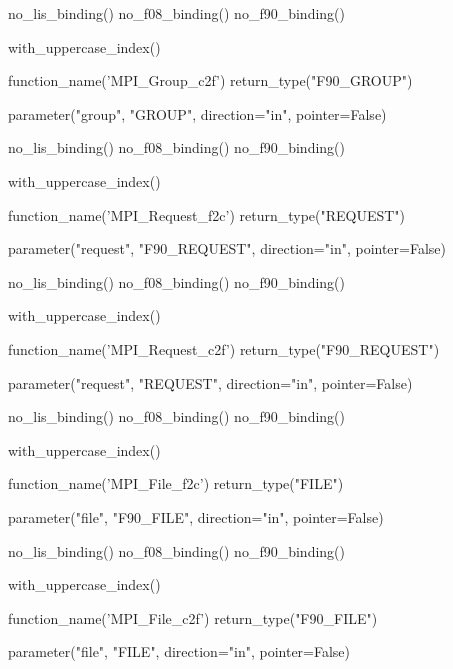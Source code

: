 %
\begin{mpi-binding}
    no_lis_binding()
    no_f08_binding()
    no_f90_binding()

    with_uppercase_index()

    function_name('MPI_Group_c2f')
    return_type("F90_GROUP")

    parameter("group", "GROUP", direction="in", pointer=False)
\end{mpi-binding}

%
\begin{mpi-binding}
    no_lis_binding()
    no_f08_binding()
    no_f90_binding()

    with_uppercase_index()

    function_name('MPI_Request_f2c')
    return_type("REQUEST")

    parameter("request", "F90_REQUEST", direction="in", pointer=False)
\end{mpi-binding}

%
\begin{mpi-binding}
    no_lis_binding()
    no_f08_binding()
    no_f90_binding()

    with_uppercase_index()

    function_name('MPI_Request_c2f')
    return_type("F90_REQUEST")

    parameter("request", "REQUEST", direction="in", pointer=False)
\end{mpi-binding}

%
\begin{mpi-binding}
    no_lis_binding()
    no_f08_binding()
    no_f90_binding()

    with_uppercase_index()

    function_name('MPI_File_f2c')
    return_type("FILE")

    parameter("file", "F90_FILE", direction="in", pointer=False)
\end{mpi-binding}

%
\begin{mpi-binding}
    no_lis_binding()
    no_f08_binding()
    no_f90_binding()

    with_uppercase_index()

    function_name('MPI_File_c2f')
    return_type("F90_FILE")

    parameter("file", "FILE", direction="in", pointer=False)
\end{mpi-binding}

